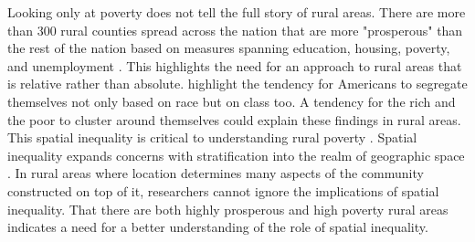  Looking only at poverty does not tell the full story of rural areas. There are more than 300 rural counties spread across the nation that are more "prosperous" than the rest of the nation based on measures spanning education, housing, poverty, and unemployment \citep{isserman_why_2009}.  This highlights the need for an approach to rural areas that is relative rather than absolute. \citep{metzger_fair_2017} highlight the tendency for Americans to segregate themselves not only based on race but on class too. A tendency for the rich and the poor to cluster around themselves could explain these findings in rural areas. This spatial inequality is critical to understanding rural poverty \citep{thiede_spatial_2018}.  Spatial inequality expands concerns with stratification into the realm of geographic space \citep{lobao_spatial_2002}. In rural areas where location determines many aspects of the community constructed on top of it, researchers cannot ignore the implications of spatial inequality. That there are both highly prosperous and high poverty rural areas indicates a need for a better understanding of the role of spatial inequality. 

